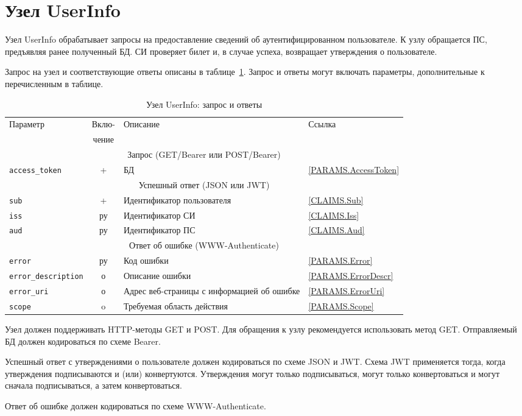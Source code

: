 \section{Узел UserInfo}\label{OIDC.UserInfo}

Узел UserInfo обрабатывает запросы на предоставление сведений 
об аутентифицированном пользователе. 
% 
К узлу обращается ПС, предъявляя ранее полученный БД.
%
СИ проверяет билет и, в случае успеха, возвращает утверждения о пользователе.


Запрос на узел и соответствующие ответы описаны в 
таблице~\ref{Table.OIDC.UserInfo}.
%
Запрос и ответы могут включать параметры, дополнительные к перечисленным в 
таблице. 

\begin{table}[H]
\caption{Узел UserInfo: запрос и ответы}\label{Table.OIDC.UserInfo}  
\begin{tabular}{|l|c|p{8.9cm}|l|}
\hline
\multirow{2}{*}{Параметр} & Вклю- & \multirow{2}{*}{Описание} & \multirow{2}{*}{Ссылка}\\
                          & чение &&\\
\hline
\hline
\multicolumn{4}{|c|}{Запрос (GET/Bearer или POST/Bearer)}\\
\hline
\hline
%
\lstinline!access_token! & + & 
БД & 
\ref{PARAMS.AccessToken}\\
\hline
%
\hline
\multicolumn{4}{|c|}{Успешный ответ (JSON или JWT)}\\
\hline
\hline
%
\lstinline!sub! & + &
Идентификатор пользователя & 
\ref{CLAIMS.Sub}\\
\hline
%
\lstinline!iss! & ру & 
Идентификатор СИ & 
\ref{CLAIMS.Iss}\\
\hline
%
\lstinline!aud! & ру & 
Идентификатор ПС & 
\ref{CLAIMS.Aud}\\
\hline
%
\hline
\multicolumn{4}{|c|}{Ответ об ошибке (WWW-Authenticate)}\\
\hline
\hline
%
\lstinline!error! & ру & 
Код ошибки & 
\ref{PARAMS.Error}\\
\hline
%
\lstinline!error_description! & о & 
Описание ошибки &
\ref{PARAMS.ErrorDescr}\\
\hline
%
\lstinline!error_uri! & о & 
Адрес веб-страницы с информацией об ошибке &
\ref{PARAMS.ErrorUri}\\
\hline
%
\lstinline!scope! & o & 
Требуемая область действия & 
\ref{PARAMS.Scope}\\
\hline
\end{tabular}
\end{table}


Узел должен поддерживать HTTP-методы GET и POST. Для обращения к узлу 
рекомендуется использовать метод GET. 
%
Отправляемый БД должен кодироваться по схеме Bearer.

Успешный ответ с утверждениями о пользователе должен кодироваться по схеме JSON 
и JWT. 
%
Схема JWT применяется тогда, когда утверждения подписываются и (или) 
конвертуются. 
%
Утверждения могут только подписываться, могут только конвертоваться и могут 
сначала подписываться, а затем конвертоваться.

Ответ об ошибке должен кодироваться по схеме WWW-Authenticate.
